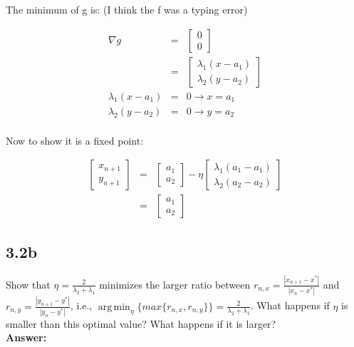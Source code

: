 \documentclass[a4paper]{article}
\DeclareMathOperator*{\argmin}{arg\,min}
\begin{document}
The minimum of g is: (I think the f was a typing error)

\begin{eqnarray}
\nabla g  &=& \begin{bmatrix}
0\\
0
\end{bmatrix}\\
&=& \begin{bmatrix}
\lambda_1 (x-a_1)\\
\lambda_2 (y-a_2)
\end{bmatrix}\\
\lambda_1 (x-a_1) &=& 0 \rightarrow x = a_1\\
\lambda_2 (y-a_2) &=& 0 \rightarrow y = a_2\\
\end{eqnarray}

Now to show it is a fixed point:

\begin{eqnarray}
\begin{bmatrix}
x_{n+1}\\
y_{n+1}
\end{bmatrix} &=& \begin{bmatrix}
a_1\\
a_2
\end{bmatrix} - \eta \begin{bmatrix}
\lambda_1 (a_1-a_1)\\
\lambda_2 (a_2-a_2)
\end{bmatrix}\\
&=& \begin{bmatrix}
a_1\\
a_2
\end{bmatrix}
\end{eqnarray}


\subsection*{3.2b}

Show that $\eta = \frac{2}{\lambda_2 + \lambda_1}$ minimizes the larger ratio between $r_{n,x} = \frac{|x_{n+1} - x^*|}{|x_n - x^*|}$ and 	$r_{n,y} = \frac{|y_{n+1} - y^*|}{|y_n - y^*|}$, i.e., $\argmin_\eta \{ max\{r_{n,x},r_{n,y} \} \} = \frac{2}{\lambda_2 + \lambda_1}$. What happens if $\eta$ is smaller than this optimal value? What happens if it is larger?\\

\textbf{Answer:}\\
\end{document}
